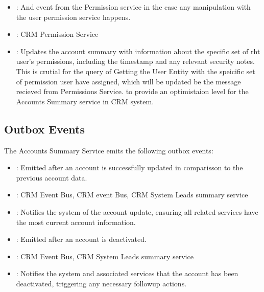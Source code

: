 \documentclass[letterpaper,10pt,english]{sphinxmanual}
\begin{document}
\sphinxAtStartPar
{}
\begin{itemize}
\item {} 
\sphinxAtStartPar
{}: And event from the Permission service in the case any manipulation with the user permission service happens.

\item {} 
\sphinxAtStartPar
{}: CRM Permission Service

\item {} 
\sphinxAtStartPar
{}: Updates the account summary with information about the specific set of rht user’s permissions, including the timestamp and any relevant security notes. This is crutial for the query of Getting the User Entity with the speicific set of permission user have assigned, which will be updated be the message recieved from Permissions Service. to provide an optimistaion level for the Accounts Summary service in CRM system.

\end{itemize}


\subsection{Outbox Events}
\label{\detokenize{crm_system/accounts_summary_service:outbox-events}}
\sphinxAtStartPar
The Accounts Summary Service emits the following outbox events:

\sphinxAtStartPar
{}
\begin{itemize}
\item {} 
\sphinxAtStartPar
{}: Emitted after an account is successfully updated in comparisson to the previous account data.

\item {} 
\sphinxAtStartPar
{}: CRM Event Bus, CRM event Bus, CRM System Leads summary service

\item {} 
\sphinxAtStartPar
{}: Notifies the system of the account update, ensuring all related services have the most current account information.

\end{itemize}

\sphinxAtStartPar
{}
\begin{itemize}
\item {} 
\sphinxAtStartPar
{}: Emitted after an account is deactivated.

\item {} 
\sphinxAtStartPar
{}: CRM Event Bus, CRM System Leads summary service

\item {} 
\sphinxAtStartPar
{}: Notifies the system and associated services that the account has been deactivated, triggering any necessary follow\sphinxhyphen{}up actions.

\end{itemize}
\end{document}
